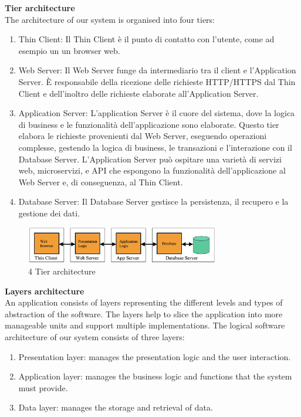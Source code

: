 \noindent \textbf{Tier architecture} \\
\noindent The architecture of our system is organised into four tiers:
\begin{enumerate}
    \item Thin Client: Il Thin Client è il punto di contatto con l'utente, come ad esempio un  un browser web.
    \item Web Server: Il Web Server funge da intermediario tra il client e l'Application Server. È responsabile della ricezione delle richieste HTTP/HTTPS dal Thin Client  e dell'inoltro delle richieste elaborate all'Application Server. 
    \item Application Server: L'application Server è il cuore del sistema, dove la logica di business e le funzionalità dell'applicazione sono elaborate. Questo tier elabora le richieste provenienti dal Web Server, eseguendo operazioni complesse, gestendo la logica di business, le transazioni e l'interazione con il Database Server. L'Application Server può ospitare una varietà di servizi web, microservizi, e API che espongono la funzionalità dell'applicazione al Web Server e, di conseguenza, al Thin Client.
    \item Database Server: Il Database Server gestisce la persistenza, il recupero e la gestione dei dati.
\end{enumerate}


\begin{figure}[H]
    \centering
    \includegraphics[width=0.75\textwidth]{Design/Screenshot 2023-12-23 at 10.54.18.png}
    \caption{4 Tier architecture}
    \label{fig:enter-label}
\end{figure}


\newpage
\noindent \textbf{Layers architecture}\\
An application consists of layers  representing the different levels and types of abstraction of the software. The layers help to slice the application into more manageable units and support multiple implementations.
 The logical software architecture of our system consists of three layers:
\begin{enumerate}
    \item Presentation layer: manages the presentation logic and the user interaction.
    \item Application layer: manages the business logic and functions that the system must provide.
    \item Data layer: manages the storage and retrieval of data.
\end{enumerate}


